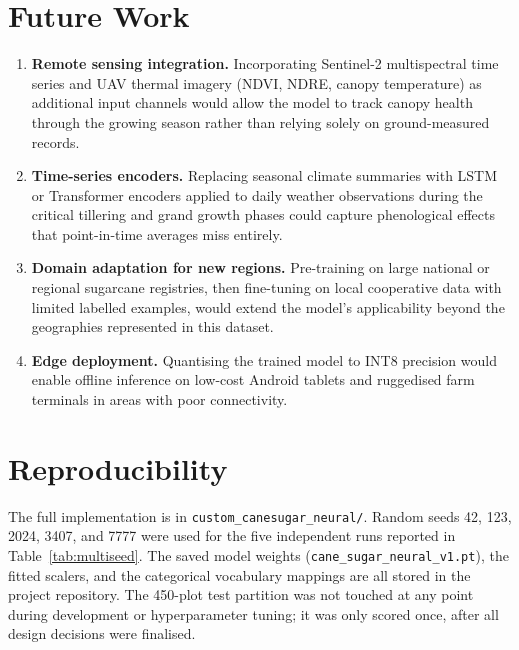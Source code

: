 \documentclass[conference,10pt,letterpaper]{IEEEtran}
\begin{document}
\section{Future Work}

\begin{enumerate}
    \item \textbf{Remote sensing integration.} Incorporating Sentinel-2 multispectral time series and UAV thermal imagery (NDVI, NDRE, canopy temperature) as additional input channels would allow the model to track canopy health through the growing season rather than relying solely on ground-measured records.
    \item \textbf{Time-series encoders.} Replacing seasonal climate summaries with LSTM or Transformer encoders applied to daily weather observations during the critical tillering and grand growth phases could capture phenological effects that point-in-time averages miss entirely.
    \item \textbf{Domain adaptation for new regions.} Pre-training on large national or regional sugarcane registries, then fine-tuning on local cooperative data with limited labelled examples, would extend the model's applicability beyond the geographies represented in this dataset.
    \item \textbf{Edge deployment.} Quantising the trained model to INT8 precision would enable offline inference on low-cost Android tablets and ruggedised farm terminals in areas with poor connectivity.
\end{enumerate}

\section{Reproducibility}

The full implementation is in \texttt{custom\_canesugar\_neural/}. Random seeds 42, 123, 2024, 3407, and 7777 were used for the five independent runs reported in Table~\ref{tab:multiseed}. The saved model weights (\texttt{cane\_sugar\_neural\_v1.pt}), the fitted scalers, and the categorical vocabulary mappings are all stored in the project repository. The 450-plot test partition was not touched at any point during development or hyperparameter tuning; it was only scored once, after all design decisions were finalised.

\end{document}
